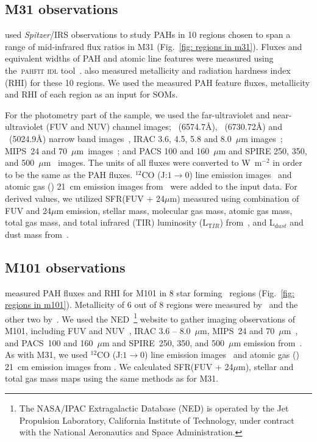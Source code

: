     \subsection{M31 observations}
     \label{Sec: data_M31_SOMN} 
     
     \cite{Dim15} used {\it Spitzer}/IRS observations to study PAHs in 10 regions chosen to span a range of mid-infrared flux ratios in M31 (Fig.~\ref{fig: regions in m31}). 
     Fluxes and equivalent widths of PAH and atomic line features were measured using the~\textsc{pahfit idl} tool~\citep{Smith07b}.
     \cite{Dim15} also measured metallicity and radiation hardness index (RHI) for these 10 regions.
     We used the measured PAH feature fluxes, metallicity and RHI of each region as an input for SOMs.
     
    For the photometry part of the sample, we used the \GALEX \citep{Martin05} far-ultraviolet and near-ultraviolet (FUV and NUV) channel images; \halpha~(6574.7\AA), \sii~(6730.72\AA) and \oiii~(5024.9\AA) narrow band images~\citep{Massey07}, IRAC 3.6, 4.5, 5.8 and 8.0~$\mu$m images~\citep{Barmby06}; MIPS~24 and 70~$\mu$m~images~\citep{Gordon06}; and PACS 100 and 160~$\mu$m and SPIRE 250, 350, and 500~$\mu$m~\citep{Fritz12} images.
     The units of all fluxes were converted to W~m$^{-2}$ in order to be the same as the PAH fluxes.
     $^{12}$CO (J:$1\rightarrow0$) line emission images~\citep{Nieten06} and atomic gas (\hi) 21~cm emission images from~\cite{Chemin09} were added to the input data. 
     For derived values, we utilized SFR(FUV + 24$\mu$m) measured using combination of FUV and 24$\mu$m emission, stellar mass, molecular gas mass, atomic gas mass, total gas mass, and total infrared (TIR) luminosity (L$_{\mathrm TIR}$) from~\cite{Rahmani16}, and L$_{\mathrm dust}$ and dust mass from~\cite{Draine14}.
     
    \subsection{M101 observations}
    \label{Sec: data_M101_SOMN} 
    
     \cite{Gordon08} measured PAH fluxes and RHI for M101 in 8 star forming \hii~regions (Fig.~\ref{fig: regions in m101}).
     Metallicity of 6 out of 8 regions were measured by~\cite{Kennicutt03} and the other two by~\cite{Gordon08}.
     We used the NED~\footnote{The NASA/IPAC Extragalactic Database (NED) is operated by the Jet Propulsion Laboratory, California Institute of Technology, under contract with the National Aeronautics and Space Administration.} website to gather imaging observations of M101, including 
      \GALEX FUV and NUV~\citep{depaz07}, IRAC 3.6 -- 8.0~$\mu$m, MIPS~24 and 70~$\mu$m~\citep{Dale09}, and PACS~100 and 160~$\mu$m and SPIRE~250, 350, and 500~$\mu$m emission from~\cite{Kennicutt11}.
     As with M31, we used $^{12}$CO (J:$1\rightarrow0$) line emission images~\citep{Helfer03} and atomic gas (\hi) 21~cm emission images from \cite{Walter08}.
     We calculated SFR(FUV + 24$\mu$m), stellar and total gas mass maps using the same methods as for M31.
     
